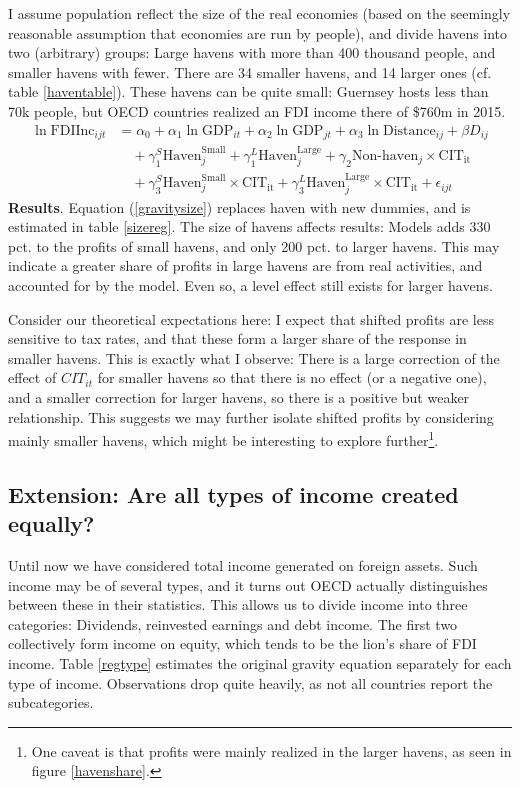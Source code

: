 \documentclass[twoside,a4paper,11pt]{article}
\begin{document}
I assume population reflect the size of the real economies (based on the seemingly reasonable assumption that economies are run by people), and divide havens into two (arbitrary) groups: Large havens with more than 400 thousand people, and smaller havens with fewer. There are 34 smaller havens, and 14 larger ones (cf. table \ref{haventable}). These havens can be quite small: Guernsey hosts less than 70k people, but OECD countries realized an FDI income there of \$760m in 2015.
\begin{equation}\label{gravitysize}
\begin{aligned}
\ln\text{FDIInc}_{ijt} &= \alpha_0 + \alpha_1\ln\text{GDP}_{it}+\alpha_2\ln\text{GDP}_{jt}+ \alpha_3\ln\text{Distance}_{ij}+\beta D_{ij} \\
&\quad + \gamma_1^S \text{Haven}^\text{Small}_j
+ \gamma_1^L \text{Haven}^\text{Large}_j +
\gamma_2\text{Non-haven}_j\times\text{CIT}_\text{it} \\
&\quad  
+ \gamma^S_3 \text{Haven}^\text{Small}_j\times \text{CIT}_\text{it}
+ \gamma^L_3 \text{Haven}^\text{Large}_j\times \text{CIT}_\text{it}
+ \epsilon_{ijt}
\end{aligned}
\end{equation}
\textbf{Results}. Equation (\ref{gravitysize}) replaces haven with new dummies, and is estimated in table \ref{sizereg}. The size of havens affects results: Models adds 330 pct. to the profits of small havens, and only 200 pct. to larger havens. This may indicate a greater share of profits in large havens are from real activities, and accounted for by the model. Even so, a level effect still exists for larger havens. 

Consider our theoretical expectations here: I expect that shifted profits are less sensitive to tax rates, and that these form a larger share of the response in smaller havens. This is exactly what I observe: There is a large correction of the effect of $ CIT_{it} $ for smaller havens so that there is no effect (or a negative one), and a smaller correction for larger havens, so there is a positive but weaker relationship. This suggests we may further isolate shifted profits by considering mainly smaller havens, which might be interesting to explore further\footnote{One caveat is that profits were mainly realized in the larger havens, as seen in figure \ref{havenshare}.}. 

\subsection{Extension: Are all types of income created equally?}
Until now we have considered total income generated on foreign assets. Such income may be of several types, and it turns out OECD actually distinguishes between these in their statistics. This allows us to divide income into three categories: Dividends, reinvested earnings and debt income. The first two collectively form income on equity, which tends to be the lion's share of FDI income. Table \ref{regtype} estimates the original gravity equation separately for each type of income. Observations drop quite heavily, as not all countries report the subcategories. 
\end{document}
